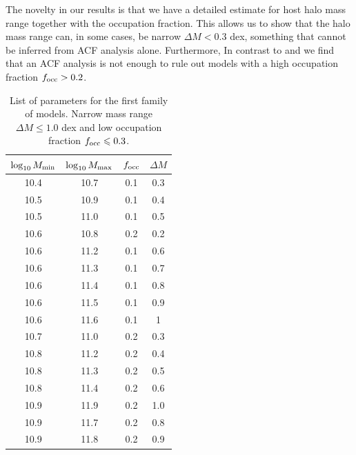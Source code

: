 \documentclass[usenatbib]{mn2e}
\begin{document}
The novelty in our results is that we have a detailed estimate for 
host halo mass range together with the occupation fraction. This allows us
to show that the halo mass range can, in some cases, be narrow $\Delta M <
0.3$ dex, something that cannot be inferred from ACF analysis alone.
Furthermore, In contrast to \cite{Gawiser07} and \cite{Ouchi2010} we
find that an ACF analysis is not enough to rule
out models with a high occupation fraction $f_{\rm occ}>0.2$.




\begin{table}
\begin{center}
\begin{tabular}{cccc}\hline\hline
$\log_{10}M_{\rm min}$ & $\log_{10}M_{\rm max}$ & $f_{\rm occ}$ & $\Delta M$\\\hline
 10.4 &10.7 & 0.1& 0.3 \\
 10.5 &10.9 & 0.1& 0.4 \\
 10.5 &11.0 & 0.1& 0.5 \\
 10.6 &10.8 & 0.2& 0.2 \\
 10.6 &11.2 & 0.1& 0.6 \\
 10.6 &11.3 & 0.1& 0.7 \\
 10.6 &11.4 & 0.1& 0.8 \\
 10.6 &11.5 & 0.1& 0.9 \\
 10.6 &11.6 & 0.1& 1 \\
 10.7 &11.0 & 0.2& 0.3 \\
 10.8 &11.2 & 0.2& 0.4 \\
 10.8 &11.3 & 0.2& 0.5 \\
 10.8 &11.4 & 0.2& 0.6 \\
 10.9 &11.9 & 0.2& 1.0 \\
 10.9 &11.7 & 0.2& 0.8 \\
 10.9 &11.8 & 0.2& 0.9 \\\hline
\end{tabular}
\end{center}
\caption{\label{table:firstfamily}
List of parameters for the first
  family of models. Narrow mass range $\Delta M\leq 1.0$ dex and low
  occupation fraction $f_{\rm occ}\leq 0.3$.} 
\end{table}
\end{document}
